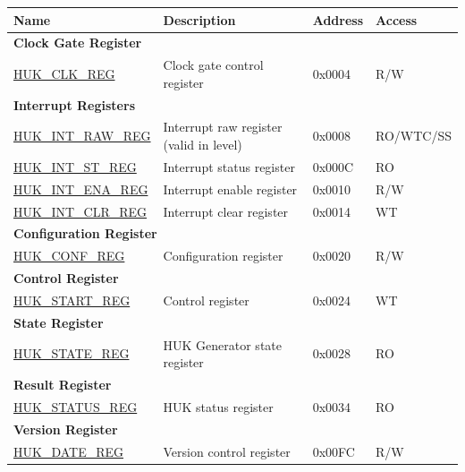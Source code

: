 \begin{longtable}{ | p{6cm} | p{6.4cm} | p{1.3cm} | p{1.8cm} | }
\hline\rowcolor{lightgray}
\textbf{Name} & \textbf{Description} &  \textbf{Address} & \textbf{Access} \\ \hline
\endhead
\multicolumn{4}{|l|}{\textbf{Clock Gate Register}} \\ \hline
\hyperref[regdesc:HUKCLKREG]{HUK\_CLK\_REG} & Clock gate control register & 0x0004 & R/W \\ \hline
\multicolumn{4}{|l|}{\textbf{Interrupt Registers}} \\ \hline
\hyperref[regdesc:HUKINTRAWREG]{HUK\_INT\_RAW\_REG} & Interrupt raw register (valid in level) & 0x0008 & RO/WTC/SS \\ \hline
\hyperref[regdesc:HUKINTSTREG]{HUK\_INT\_ST\_REG} & Interrupt status register & 0x000C & RO \\ \hline
\hyperref[regdesc:HUKINTENAREG]{HUK\_INT\_ENA\_REG} & Interrupt enable register & 0x0010 & R/W \\ \hline
\hyperref[regdesc:HUKINTCLRREG]{HUK\_INT\_CLR\_REG} & Interrupt clear register & 0x0014 & WT \\ \hline
\multicolumn{4}{|l|}{\textbf{Configuration Register}} \\ \hline
\hyperref[regdesc:HUKCONFREG]{HUK\_CONF\_REG} & Configuration register & 0x0020 & R/W \\ \hline
\multicolumn{4}{|l|}{\textbf{Control Register}} \\ \hline
\hyperref[regdesc:HUKSTARTREG]{HUK\_START\_REG} & Control register & 0x0024 & WT \\ \hline
\multicolumn{4}{|l|}{\textbf{State Register}} \\ \hline
\hyperref[regdesc:HUKSTATEREG]{HUK\_STATE\_REG} & HUK Generator state register & 0x0028 & RO \\ \hline
\multicolumn{4}{|l|}{\textbf{Result Register}} \\ \hline
\hyperref[regdesc:HUKSTATUSREG]{HUK\_STATUS\_REG} & HUK status register & 0x0034 & RO \\ \hline
\multicolumn{4}{|l|}{\textbf{Version Register}} \\ \hline
\hyperref[regdesc:HUKDATEREG]{HUK\_DATE\_REG} & Version control register & 0x00FC & R/W \\ \hline
\end{longtable}